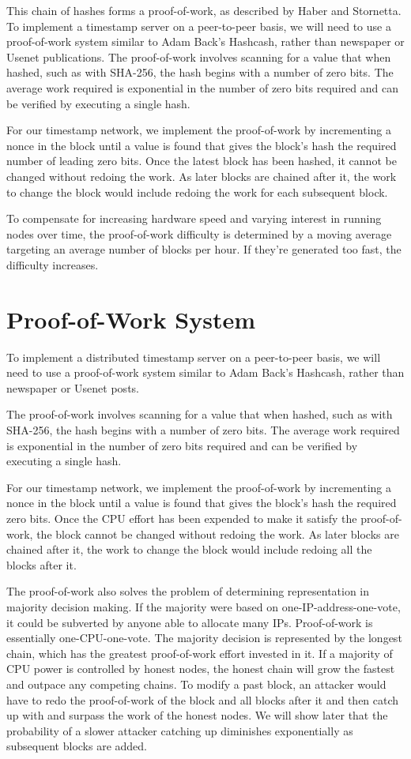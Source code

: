 \documentclass{article}
\begin{document}
This chain of hashes forms a proof-of-work, as described by Haber and Stornetta. To implement a timestamp server on a peer-to-peer basis, we will need to use a proof-of-work system similar to Adam Back's Hashcash, rather than newspaper or Usenet publications. The proof-of-work involves scanning for a value that when hashed, such as with SHA-256, the hash begins with a number of zero bits. The average work required is exponential in the number of zero bits required and can be verified by executing a single hash.

For our timestamp network, we implement the proof-of-work by incrementing a nonce in the block until a value is found that gives the block's hash the required number of leading zero bits. Once the latest block has been hashed, it cannot be changed without redoing the work. As later blocks are chained after it, the work to change the block would include redoing the work for each subsequent block.

To compensate for increasing hardware speed and varying interest in running nodes over time, the proof-of-work difficulty is determined by a moving average targeting an average number of blocks per hour. If they're generated too fast, the difficulty increases.

\section{Proof-of-Work System}

To implement a distributed timestamp server on a peer-to-peer basis, we will need to use a proof-of-work system similar to Adam Back's Hashcash, rather than newspaper or Usenet posts.

The proof-of-work involves scanning for a value that when hashed, such as with SHA-256, the hash begins with a number of zero bits. The average work required is exponential in the number of zero bits required and can be verified by executing a single hash.

For our timestamp network, we implement the proof-of-work by incrementing a nonce in the block until a value is found that gives the block's hash the required zero bits. Once the CPU effort has been expended to make it satisfy the proof-of-work, the block cannot be changed without redoing the work. As later blocks are chained after it, the work to change the block would include redoing all the blocks after it.

The proof-of-work also solves the problem of determining representation in majority decision making. If the majority were based on one-IP-address-one-vote, it could be subverted by anyone able to allocate many IPs. Proof-of-work is essentially one-CPU-one-vote. The majority decision is represented by the longest chain, which has the greatest proof-of-work effort invested in it. If a majority of CPU power is controlled by honest nodes, the honest chain will grow the fastest and outpace any competing chains. To modify a past block, an attacker would have to redo the proof-of-work of the block and all blocks after it and then catch up with and surpass the work of the honest nodes. We will show later that the probability of a slower attacker catching up diminishes exponentially as subsequent blocks are added.
\end{document}
